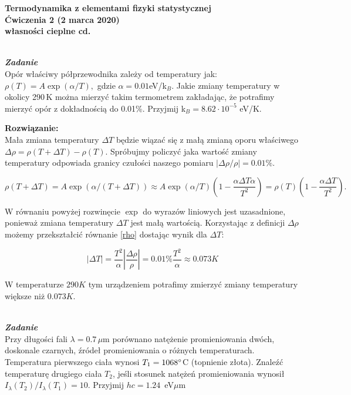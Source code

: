 \documentclass[11pt,a4paper]{article}
\newcounter{zadanie}\newcommand{\zadanie}[1][]{\addtocounter{zadanie}{1} ~\\  {\bf \emph{Zadanie \arabic{zadanie} #1 }} \\}
\begin{document}
\vspace*{-1.8cm}

\begin{centering}
\bf{\Large{Termodynamika z elementami fizyki statystycznej}}\\
Ćwiczenia 2 (2 marca 2020)\\[1mm]
własności cieplne cd. \\
\end{centering}

\zadanie
Opór właściwy półprzewodnika zależy od temperatury jak:
$ \rho(T) = A \exp{(\alpha / T)}, $ 
gdzie $\alpha = 0.01$eV/k$_B$.
Jakie zmiany temperatury  w okolicy 290\,K można mierzyć takim termometrem
zakładając, że potrafimy mierzyć opór z dokładnością do 0.01\%.
Przyjmij k$_B = 8.62 \cdot 10^{-5}$ eV/K.

\vskip 10pt
\textbf{Rozwiązanie:}\\
Mała zmiana temperatury $\Delta T$ będzie wiązać się z małą zmianą oporu właściwego
$\Delta \rho = \rho(T+\Delta T) - \rho(T)$. Spróbujmy policzyć jaka wartość zmiany temperatury
odpowiada granicy czułości naszego pomiaru $|\Delta \rho/\rho| = 0.01\%$.

\begin{equation}
  \rho(T+\Delta T) = A \exp(\alpha/(T+\Delta T)) \approx A\exp(\alpha/T)
  \left(1-\frac{\alpha \Delta T \alpha}{T^2}\right) =
  \rho(T)\left(1 - \frac{\alpha \Delta T }{T^2}\right).\label{rho}
\end{equation}

W równaniu powyżej rozwinęcie $\exp$ do wyrazów liniowych jest uzasadnione,
ponieważ zmiana temperatury $\Delta T$ jest małą wartością. Korzystając z
definicji $\Delta\rho$ możemy przekształcić równanie \eqref{rho} dostając wynik dla $\Delta T$: 

\begin{equation}
|\Delta T| = \frac{T^2}{\alpha} \left|\frac{\Delta \rho}{\rho}\right| = 0.01\% \frac{T^2}{\alpha} \approx 0.073 K
\end{equation}

W temperaturze $290K$ tym urządzeniem potrafimy zmierzyć zmiany temperatury większe niż $0.073 K$.

\newpage

\zadanie
Przy długości fali $\lambda = 0.7\,\mu$m porównano natężenie promieniowania dwóch,
doskonale czarnych, źródeł promieniowania o różnych temperaturach.
Temperatura pierwszego ciała wynosi $T_1 = 1068 \degree$C (topnienie złota). 
Znaleźć temperaturę drugiego ciała $T_2$, jeśli stosunek natężeń promieniowania 
wynosił $I_\lambda (T_2)/I_\lambda (T_1) = 10$.
Przyjmij $hc = 1.24$~eV$\mu$m
\end{document}
